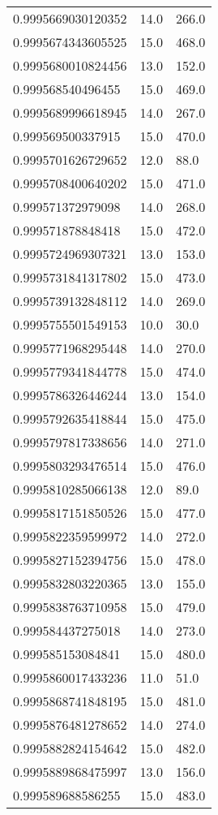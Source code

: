 \begin{center}
\begin{supertabular}[H]{p{0.30\textwidth}p{0.05\textwidth}p{0.05\textwidth}}
0.9995669030120352 & 14.0 & 266.0 \\ 
0.9995674343605525 & 15.0 & 468.0 \\ 
0.9995680010824456 & 13.0 & 152.0 \\ 
0.999568540496455 & 15.0 & 469.0 \\ 
0.9995689996618945 & 14.0 & 267.0 \\ 
0.999569500337915 & 15.0 & 470.0 \\ 
0.9995701626729652 & 12.0 & 88.0 \\ 
0.9995708400640202 & 15.0 & 471.0 \\ 
0.999571372979098 & 14.0 & 268.0 \\ 
0.999571878848418 & 15.0 & 472.0 \\ 
0.9995724969307321 & 13.0 & 153.0 \\ 
0.9995731841317802 & 15.0 & 473.0 \\ 
0.9995739132848112 & 14.0 & 269.0 \\ 
0.9995755501549153 & 10.0 & 30.0 \\ 
0.9995771968295448 & 14.0 & 270.0 \\ 
0.9995779341844778 & 15.0 & 474.0 \\ 
0.9995786326446244 & 13.0 & 154.0 \\ 
0.9995792635418844 & 15.0 & 475.0 \\ 
0.9995797817338656 & 14.0 & 271.0 \\ 
0.9995803293476514 & 15.0 & 476.0 \\ 
0.9995810285066138 & 12.0 & 89.0 \\ 
0.9995817151850526 & 15.0 & 477.0 \\ 
0.9995822359599972 & 14.0 & 272.0 \\ 
0.9995827152394756 & 15.0 & 478.0 \\ 
0.9995832803220365 & 13.0 & 155.0 \\ 
0.9995838763710958 & 15.0 & 479.0 \\ 
0.999584437275018 & 14.0 & 273.0 \\ 
0.999585153084841 & 15.0 & 480.0 \\ 
0.9995860017433236 & 11.0 & 51.0 \\ 
0.9995868741848195 & 15.0 & 481.0 \\ 
0.9995876481278652 & 14.0 & 274.0 \\ 
0.9995882824154642 & 15.0 & 482.0 \\ 
0.9995889868475997 & 13.0 & 156.0 \\ 
0.999589688586255 & 15.0 & 483.0 \\ 

\end{supertabular}
\end{center}
